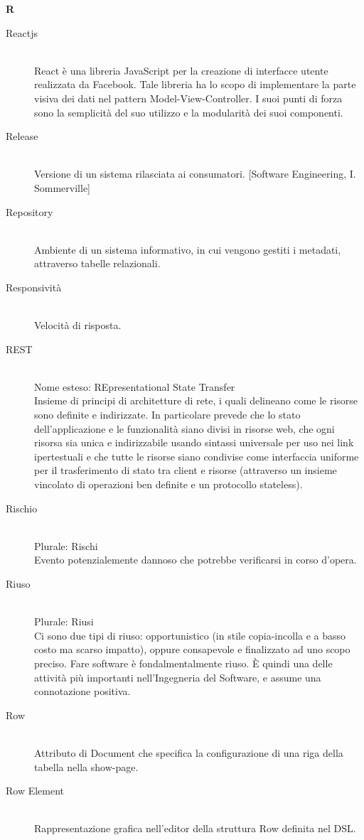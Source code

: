 \newpage 
\begin{center}\textbf{\Huge{R}}\end{center}
\begin{description}\item[Reactjs] \hfill \\
React è una libreria JavaScript per la creazione di interfacce utente realizzata da Facebook. Tale libreria ha lo scopo di implementare la parte visiva dei dati nel pattern Model-View-Controller. I suoi punti di forza sono la semplicità del suo utilizzo e la modularità dei suoi componenti.
 \item[Release] \hfill \\
Versione di un sistema rilasciata ai consumatori. [Software Engineering, I. Sommerville]
 \item[Repository] \hfill \\
Ambiente di un sistema informativo, in cui vengono gestiti i metadati, attraverso tabelle relazionali.
 \item[Responsività] \hfill \\
Velocità di risposta.
 \item[REST] \hfill \\
Nome esteso: REpresentational State Transfer\\ 
Insieme di principi di architetture di rete, i quali delineano come le risorse sono definite e indirizzate. In particolare prevede che lo stato dell'applicazione e le funzionalità siano divisi in risorse web, che ogni risorsa sia unica e indirizzabile usando sintassi universale per uso nei link ipertestuali e che tutte le risorse siano condivise come interfaccia uniforme per il trasferimento di stato tra client e risorse (attraverso un insieme vincolato di operazioni ben definite e un protocollo stateless).
 \item[Rischio] \hfill \\
Plurale: Rischi\\ 
Evento potenzialemente dannoso che potrebbe verificarsi in corso d'opera.
 \item[Riuso] \hfill \\
Plurale: Riusi\\ 
Ci sono due tipi di riuso: opportunistico (in stile
		copia-incolla e a basso costo ma scarso impatto), oppure consapevole e finalizzato ad uno scopo preciso. Fare software è fondalmentalmente riuso. È quindi una delle attività più importanti nell'Ingegneria del Software, e assume una connotazione positiva.
 \item[Row] \hfill \\
Attributo di Document che specifica la configurazione di una riga della tabella nella show-page.
 \item[Row Element] \hfill \\
Rappresentazione grafica nell'editor della struttura Row definita nel DSL.
 \end{description}
